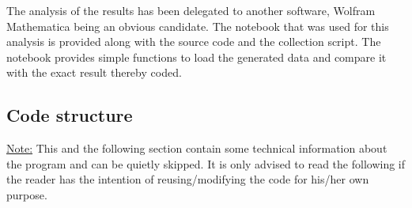 \documentclass[11pt]{article}
\begin{document}
The analysis of the results has been delegated to another software, Wolfram Mathematica being an obvious candidate. The notebook that was used for this analysis is provided along with the source code and the collection script.
The notebook provides simple functions to load the generated data and compare it with the exact result thereby coded.



\subsection{Code structure}

\underline{Note:} This and the following section contain some technical information about the program and can be quietly skipped. It is only advised to read the following if the reader has the intention of reusing/modifying the code for his/her own purpose.
\end{document}
